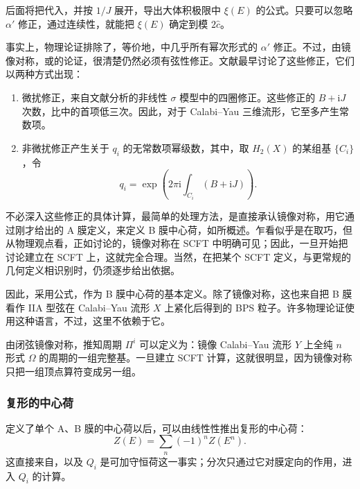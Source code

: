 后面将把代入，并按 $1/J$ 展开，导出大体积极限中 $\xi(E)$ 的公式。只要可以忽略 $\alpha'$ 修正，通过连续性，就能把 $\xi(E)$ 确定到模 $2\hat c$。

事实上，物理论证排除了，等价地，中几乎所有幂次形式的 $\alpha'$ 修正。不过，由镜像对称，或的论证，很清楚仍然必须有弦性修正。文献最早讨论了这些修正，它们以两种方式出现：
\begin{enumerate}[label=(\arabic*)]
\item 微扰修正，来自文献分析的非线性 $\sigma$ 模型中的四圈修正。这些修正的 $B+\mathrm{i}J$ 次数，比中的首项低三次。因此，对于 Calabi--Yau 三维流形，它至多产生常数项。
\item 非微扰修正产生关于 $q_i$ 的无常数项幂级数，其中，取 $H_2(X)$ 的某组基 $\{C_i\}$，令
\[
q_i=\exp\!\left(2\pi\mathrm{i}\int_{C_i}(B+\mathrm{i}J)\right).
\]
\end{enumerate}

不必深入这些修正的具体计算，最简单的处理方法，是直接承认镜像对称，用它通过刚才给出的 A 膜定义，来定义 B 膜中心荷，如所概述。乍看似乎是在取巧，但从物理观点看，正如讨论的，镜像对称在 SCFT 中明确可见；因此，一旦开始把讨论建立在 SCFT 上，这就完全合理。当然，在把某个 SCFT 定义，与更常规的几何定义相识别时，仍须逐步给出依据。

因此，采用公式，作为 B 膜中心荷的基本定义。除了镜像对称，这也来自把 B 膜看作 IIA 型弦在 Calabi--Yau 流形 $X$ 上紧化后得到的 BPS 粒子。许多物理论证使用这种语言，不过，这里不依赖于它。

由闭弦镜像对称，推知周期 $\Pi^i$ 可以定义为：镜像 Calabi--Yau 流形 $Y$ 上全纯 $n$ 形式 $\Omega$ 的周期的一组完整基。一旦建立 SCFT 计算，这就很明显，因为镜像对称只把一组顶点算符变成另一组。

\subsubsection{复形的中心荷}\label{sec:5.3.5.6}

定义了单个 A、B 膜的中心荷以后，可以由线性性推出复形的中心荷：
\[
Z(E)=\sum_n(-1)^nZ(E^n).
\]
这直接来自，以及 $Q_i$ 是可加守恒荷这一事实；分次只通过它对膜定向的作用，进入 $Q_i$ 的计算。

